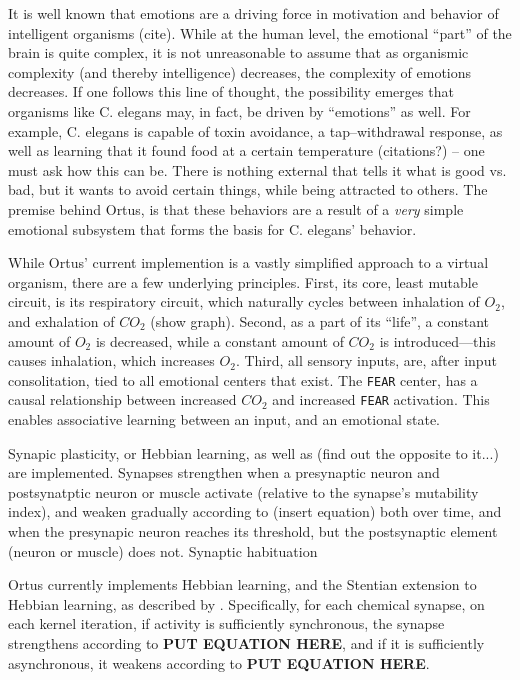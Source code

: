 \documentclass[letterpaper]{article}
\begin{document}
It is well known that emotions are a driving force in motivation and behavior of intelligent organisms (cite). While at the human level, the emotional ``part'' of the brain is quite complex, it is not unreasonable to assume that as organismic complexity (and thereby intelligence) decreases, the complexity of emotions decreases. If one follows this line of thought, the possibility emerges that organisms like C. elegans may, in fact, be driven by ``emotions'' as well. For example, C. elegans is capable of toxin avoidance, a tap--withdrawal response, as well as learning that it found food at a certain temperature (citations?) -- one must ask how this can be. There is nothing external that tells it what is good vs. bad, but it wants to avoid certain things, while being attracted to others. The premise behind Ortus, is that these behaviors are a result of a \textit{very} simple emotional subsystem that forms the basis for C. elegans' behavior.

While Ortus' current implemention is a vastly simplified approach to a virtual organism, there are a few underlying principles. First, its core, least mutable circuit, is its respiratory circuit, which naturally cycles between inhalation of $O_2$, and exhalation of $CO_2$ (show graph). Second, as a part of its ``life'', a constant amount of $O_2$ is decreased, while a constant amount of $CO_2$ is introduced---this causes inhalation, which increases $O_2$. Third, all sensory inputs, are, after input consolitation, tied to all emotional centers that exist. The \texttt{FEAR} center, has a causal relationship between increased $CO_2$ and increased \texttt{FEAR} activation. This enables associative learning between an input, and an emotional state.


Synapic plasticity, or Hebbian learning, as well as (find out the opposite to it...) are implemented. Synapses strengthen when a presynaptic neuron and postsynatptic neuron or muscle activate (relative to the synapse's mutability index), and weaken gradually according to (insert equation) both over time, and when the presynapic neuron reaches its threshold, but the postsynaptic element (neuron or muscle) does not.
Synaptic habituation

Ortus currently implements Hebbian learning, and the Stentian extension to Hebbian learning, as described by \cite{Kutsarova2016}. Specifically, for each chemical synapse, on each kernel iteration, if activity is sufficiently synchronous, the synapse strengthens according to \textbf{PUT EQUATION HERE}, and if it is sufficiently asynchronous, it weakens according to \textbf{PUT EQUATION HERE}. 
\end{document}
